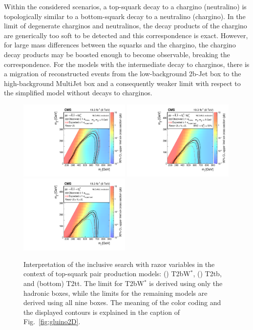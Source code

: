 Within the considered scenarios, a top-squark decay
to a chargino (neutralino) is topologically similar to a bottom-squark
decay to a neutralino (chargino). In the limit of degenerate charginos
and neutralinos, the decay products of the chargino are
generically too soft to be detected and this correspondence is
exact. However, for large mass differences between the squarks and the
chargino, the chargino decay products may be boosted enough to become
observable, breaking the correspondence. For the models
with the intermediate decay to charginos, there is a migration
of reconstructed events from the low-background 2b-Jet box to the
high-background MultiJet box and a consequently weaker
limit with respect to the simplified model without decays to charginos.

\begin{figure}[tb!]
\centering
\includegraphics[width=0.49\textwidth]{figs/analysis8TeV/T2bwHybridNew0LXSEC.pdf}
\includegraphics[width=0.49\textwidth]{figs/analysis8TeV/T2tbHybridNew0Lp1Lp2LXSEC.pdf}
\includegraphics[width=0.49\textwidth]{figs/analysis8TeV/T2ttHybridNew0Lp1Lp2LXSEC.pdf}
\caption{Interpretation of the inclusive search with razor variables
  in the context of top-squark pair production models: (\cmsUpperLeft)
  T2bW$^{\ast}$, (\cmsUpperRight) T2tb, and (bottom) T2tt.  The limit for T2bW$^{\ast}$
  is derived using only the hadronic boxes, while the limits for the
  remaining models are derived using all nine boxes. The meaning of
  the color coding and the displayed contours is explained in the
  caption of Fig.~\ref{fig:gluino2D}.\label{fig:squark2D}}
\end{figure}

